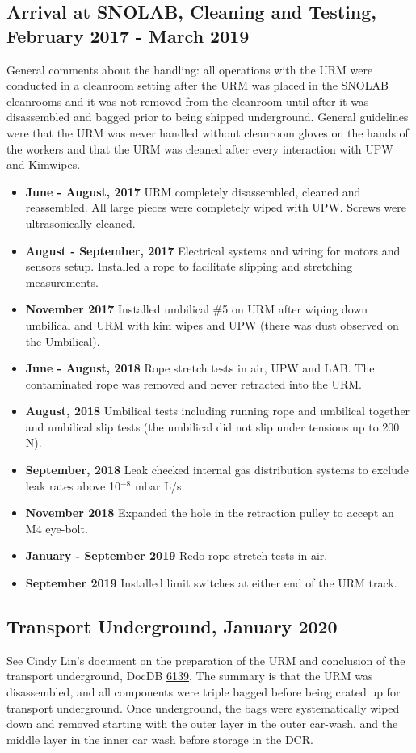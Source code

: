 \documentclass[11pt]{article}
\begin{document}
\subsection{Arrival at SNOLAB, Cleaning and Testing, February 2017 - March 2019}
General comments about the handling: all operations with the URM were conducted in a cleanroom setting after the URM was placed in the SNOLAB cleanrooms and it was not removed from the cleanroom until after it was disassembled and bagged prior to being shipped underground. General guidelines were that the URM was never handled without cleanroom gloves on the hands of the workers and that the URM was cleaned after every interaction with UPW and Kimwipes. 
\begin{itemize}
\item {\bf June - August, 2017} URM completely disassembled, cleaned and reassembled. All large pieces were completely wiped with UPW. Screws were ultrasonically cleaned. 
\item {\bf August - September, 2017} Electrical systems and wiring for motors and sensors setup. Installed a rope to facilitate slipping and stretching measurements.
\item {\bf November 2017} Installed umbilical \#5 on URM after wiping down umbilical and URM with kim wipes and UPW (there was dust observed on the Umbilical).
\item {\bf June - August, 2018} Rope stretch tests in air, UPW and LAB. The contaminated rope was removed and never retracted into the URM.
\item {\bf August, 2018} Umbilical tests including running rope and umbilical together and umbilical slip tests (the umbilical did not slip under tensions up to 200 N).
\item {\bf September, 2018} Leak checked internal gas distribution systems to exclude leak rates above 10$^{-8}$ mbar L/s.
\item {\bf November 2018} Expanded the hole in the retraction pulley to accept an M4 eye-bolt.
\item {\bf January - September 2019} Redo rope stretch tests in air. 
\item {\bf September 2019} Installed limit switches at either end of
  the URM track.
\end{itemize}

\subsection{Transport Underground, January 2020}
See Cindy Lin's document on the preparation of the URM and conclusion of the transport underground, DocDB \href{https://www.snolab.ca/snoplus/private/DocDB/0061/006139/002/URM4_Final_Packing__Transporting_UG__and_DCR_Cleaning.pdf}{6139}. The summary is that the URM was disassembled, and all components were triple bagged before being crated up for transport underground. Once underground, the bags were systematically wiped down and removed starting with the outer layer in the outer car-wash, and the middle layer in the inner car wash before storage in the DCR. 
\end{document}
